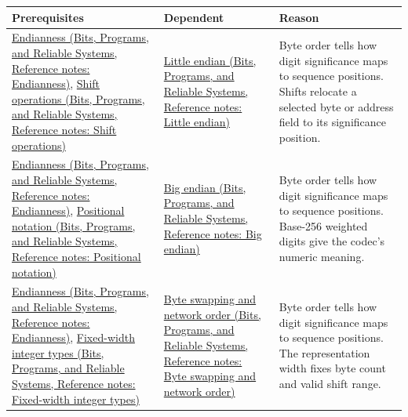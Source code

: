 {\def\LTcaptype{none} %
\begin{longtable}[]{@{}
  >{\raggedright\arraybackslash}p{}
  >{\raggedright\arraybackslash}p{}
  >{\raggedright\arraybackslash}p{}@{}}
\toprule\noalign{}
\begin{minipage}[b]{\linewidth}\raggedright
Prerequisites
\end{minipage} & \begin{minipage}[b]{\linewidth}\raggedright
Dependent
\end{minipage} & \begin{minipage}[b]{\linewidth}\raggedright
Reason
\end{minipage} \\
\midrule\noalign{}
\endhead
\bottomrule\noalign{}
\endlastfoot
\href{../01-Bits-Programs-and-Reliable-Systems/main.pdf\#nameddest=appendix-bc07c3d25b18}{Endianness (Bits, Programs, and Reliable Systems, Reference notes: Endianness)}, \href{../01-Bits-Programs-and-Reliable-Systems/main.pdf\#nameddest=appendix-73425b25118e}{Shift operations (Bits, Programs, and Reliable Systems, Reference notes: Shift operations)} & \href{../01-Bits-Programs-and-Reliable-Systems/main.pdf\#nameddest=appendix-367b6abf460e}{Little endian (Bits, Programs, and Reliable Systems, Reference notes: Little endian)} & Byte order tells how digit significance maps to sequence positions. Shifts relocate a selected byte or address field to its significance position. \\
\href{../01-Bits-Programs-and-Reliable-Systems/main.pdf\#nameddest=appendix-bc07c3d25b18}{Endianness (Bits, Programs, and Reliable Systems, Reference notes: Endianness)}, \href{../01-Bits-Programs-and-Reliable-Systems/main.pdf\#nameddest=appendix-83c3f28f7bda}{Positional notation (Bits, Programs, and Reliable Systems, Reference notes: Positional notation)} & \href{../01-Bits-Programs-and-Reliable-Systems/main.pdf\#nameddest=appendix-92e040df969a}{Big endian (Bits, Programs, and Reliable Systems, Reference notes: Big endian)} & Byte order tells how digit significance maps to sequence positions. Base-256 weighted digits give the codec's numeric meaning. \\
\href{../01-Bits-Programs-and-Reliable-Systems/main.pdf\#nameddest=appendix-bc07c3d25b18}{Endianness (Bits, Programs, and Reliable Systems, Reference notes: Endianness)}, \href{../01-Bits-Programs-and-Reliable-Systems/main.pdf\#nameddest=appendix-cc04044b5782}{Fixed-width integer types (Bits, Programs, and Reliable Systems, Reference notes: Fixed-width integer types)} & \href{../01-Bits-Programs-and-Reliable-Systems/main.pdf\#nameddest=appendix-11ba36693aa2}{Byte swapping and network order (Bits, Programs, and Reliable Systems, Reference notes: Byte swapping and network order)} & Byte order tells how digit significance maps to sequence positions. The representation width fixes byte count and valid shift range. \\

\end{longtable}}
